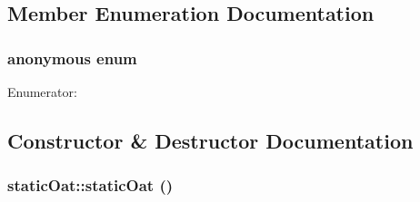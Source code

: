 \subsection{Member Enumeration Documentation}
\hypertarget{classstatic_oat_a808f6377ccb3b9c79bfcc29f9c59144b}{
\subsubsection[{"@20}]{\setlength{\rightskip}{0pt plus 5cm}anonymous enum}}
\label{classstatic_oat_a808f6377ccb3b9c79bfcc29f9c59144b}
\begin{Desc}
\item[Enumerator: ]\par
\begin{description}
\item[{\em 
\hypertarget{classstatic_oat_a808f6377ccb3b9c79bfcc29f9c59144bae5b4b14454be7e35979e97c3f11ea3d6}{
Num\_\-of\_\-pr\_\-str}
\label{classstatic_oat_a808f6377ccb3b9c79bfcc29f9c59144bae5b4b14454be7e35979e97c3f11ea3d6}
}]\item[{\em 
\hypertarget{classstatic_oat_a808f6377ccb3b9c79bfcc29f9c59144ba89ce7fa90d4e02bcda8a9408cca76e2c}{
Nitrogen\_\-levels}
\label{classstatic_oat_a808f6377ccb3b9c79bfcc29f9c59144ba89ce7fa90d4e02bcda8a9408cca76e2c}
}]\end{description}
\end{Desc}



\subsection{Constructor \& Destructor Documentation}
\hypertarget{classstatic_oat_afcf04a462cdd16c42cc6aad49eb2b06e}{
\subsubsection[{staticOat}]{\setlength{\rightskip}{0pt plus 5cm}staticOat::staticOat ()}}
\label{classstatic_oat_afcf04a462cdd16c42cc6aad49eb2b06e}


